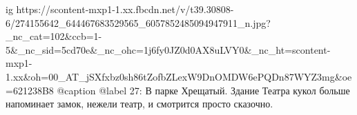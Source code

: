  
 
 
 
 

\ifcmt
  ig https://scontent-mxp1-1.xx.fbcdn.net/v/t39.30808-6/274155642_644467683529565_6057852485094947911_n.jpg?_nc_cat=102&ccb=1-5&_nc_sid=5cd70e&_nc_ohc=1j6fy0JZ0d0AX8uLVY0&_nc_ht=scontent-mxp1-1.xx&oh=00_AT_jSXfxbz0sh86tZofbZLexW9DnOMDW6ePQDn87WYZ3mg&oe=621238B8
  @caption @label 27: В парке Хрещатый. Здание Театра кукол больше напоминает замок, нежели театр, и смотрится просто сказочно.
\fi
